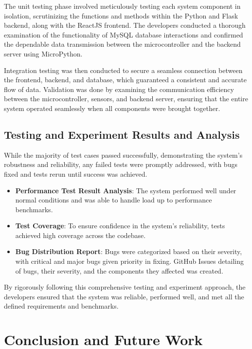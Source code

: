 \documentclass[conference]{IEEEtran}
\begin{document}
The unit testing phase involved meticulously testing each system component in isolation,
scrutinizing the functions and methods within the Python and Flask backend, along
with the ReactJS frontend. The developers conducted a thorough examination of the
functionality of MySQL database interactions and confirmed the dependable data
transmission between the microcontroller and the backend server using MicroPython.

Integration testing was then conducted to secure a seamless connection between
the frontend, backend, and database, which guaranteed a consistent and accurate
flow of data. Validation was done by examining the communication efficiency between
the microcontroller, sensors, and backend server, ensuring that the entire system
operated seamlessly when all components were brought together.

\subsection{Testing and Experiment Results and Analysis}

While the majority of test cases passed successfully, demonstrating the system’s
robustness and reliability, any failed tests were promptly addressed,
with bugs fixed and tests rerun until success was achieved.

\begin{itemize}
      \item \textbf{Performance Test Result Analysis}: The system performed well
            under normal conditions and was able to handle load up to performance benchmarks.
      \item \textbf{Test Coverage}: To ensure confidence in the system’s reliability,
            tests achieved high coverage across the codebase.
      \item \textbf{Bug Distribution Report}: Bugs were categorized based on their
            severity, with critical and major bugs given priority in fixing. GitHub
            Issues detailing of bugs, their severity, and the components
            they affected was created.
\end{itemize}

By rigorously following this comprehensive testing and experiment
approach, the developers ensured that the system was reliable,
performed well, and met all the defined requirements and benchmarks.

\section{Conclusion and Future Work}
\end{document}
